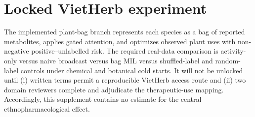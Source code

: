 \documentclass[11pt]{article}
\begin{document}
\section{Locked VietHerb experiment}

The implemented plant-bag branch represents each species as a bag of reported
metabolites, applies gated attention, and optimizes observed plant uses with
non-negative positive--unlabelled risk. The required real-data comparison is
activity-only versus naive broadcast versus bag MIL versus shuffled-label and
random-label controls under chemical and botanical cold starts. It will not be
unlocked until (i) written terms permit a reproducible VietHerb access route and
(ii) two domain reviewers complete and adjudicate the therapeutic-use mapping.
Accordingly, this supplement contains no estimate for the central
ethnopharmacological effect.
\end{document}
